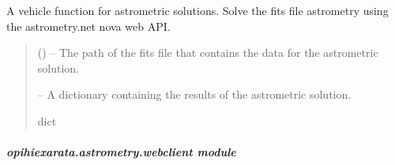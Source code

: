 \documentclass[letterpaper,11pt,english]{sphinxmanual}
\begin{document}
\begin{savenotes}\begin{fulllineitems}
\label{\detokenize{code/opihiexarata.astrometry.solution:opihiexarata.astrometry.solution._vehicle_astrometrynet_web_api}}
\pysigstartsignatures
{}
\pysigstopsignatures
\sphinxAtStartPar
A vehicle function for astrometric solutions. Solve the fits file
astrometry using the astrometry.net nova web API.
\begin{quote}\begin{description}
\sphinxAtStartPar
{} () – The path of the fits file that contains the data for the astrometric
solution.

\sphinxAtStartPar
{} – A dictionary containing the results of the astrometric solution.

\sphinxAtStartPar
dict

\end{description}\end{quote}

\end{fulllineitems}\end{savenotes}


\sphinxstepscope


\subparagraph{opihiexarata.astrometry.webclient module}
\label{\detokenize{code/opihiexarata.astrometry.webclient:module-opihiexarata.astrometry.webclient}}\label{\detokenize{code/opihiexarata.astrometry.webclient:opihiexarata-astrometry-webclient-module}}\label{\detokenize{code/opihiexarata.astrometry.webclient::doc}}
\end{document}
